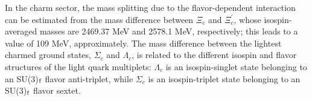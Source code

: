 \documentclass[twocolumn,superscriptaddress,preprintnumbers,nofootinbib]{revtex4}
\begin{document}






In the charm sector, the mass splitting  due to the flavor-dependent interaction can be estimated from the mass difference between $\Xi_c$ and  $\Xi_c^{'}$, whose isospin-averaged masses are 2469.37 MeV and 2578.1 MeV, respectively; this leads to a value of 109 MeV, approximately.
The mass difference between the lightest charmed ground states, $\Sigma_c$ and  $\Lambda_c$, is related to the different isospin and flavor structures of the light quark multiplets: $\Lambda_c$ is an isospin-singlet state belonging to an SU(3)$_{\rm f}$ flavor anti-triplet,  while $\Sigma_c$ is an isospin-triplet state belonging to an SU(3)$_{\rm f}$ flavor sextet.
\end{document}
